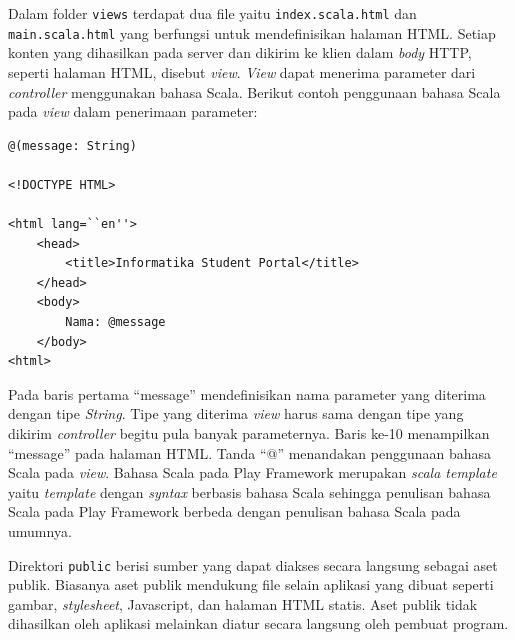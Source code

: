 Dalam folder \texttt{views} terdapat dua file yaitu \texttt{index.scala.html} dan \texttt{main.scala.html} yang berfungsi untuk mendefinisikan halaman HTML. Setiap konten yang dihasilkan pada server dan dikirim ke klien dalam \textit{body} HTTP, seperti halaman HTML, disebut \textit{view}. \textit{View} dapat menerima parameter dari \textit{controller} menggunakan bahasa Scala. Berikut contoh penggunaan bahasa Scala pada \textit{view} dalam penerimaan parameter:
\begin{lstlisting}
@(message: String)

<!DOCTYPE HTML>

<html lang=``en''>
	<head>
		<title>Informatika Student Portal</title>
	</head>
	<body>
		Nama: @message
	</body>
<html>
\end{lstlisting}
Pada baris pertama ``message'' mendefinisikan nama parameter yang diterima dengan tipe \textit{String}. Tipe yang diterima \textit{view} harus sama dengan tipe yang dikirim \textit{controller} begitu pula banyak parameternya. Baris ke-10 menampilkan ``message'' pada halaman HTML. Tanda ``@'' menandakan penggunaan bahasa Scala pada \textit{view}. Bahasa Scala pada Play Framework merupakan \textit{scala template} yaitu \textit{template} dengan \textit{syntax} berbasis bahasa Scala sehingga penulisan bahasa Scala pada Play Framework berbeda dengan penulisan bahasa Scala pada umumnya.

Direktori \texttt{public} berisi sumber yang dapat diakses secara langsung sebagai aset publik. Biasanya aset publik mendukung file selain aplikasi yang dibuat seperti gambar, \textit{stylesheet}, Javascript, dan halaman HTML statis. Aset publik tidak dihasilkan oleh aplikasi melainkan diatur secara langsung oleh pembuat program.

